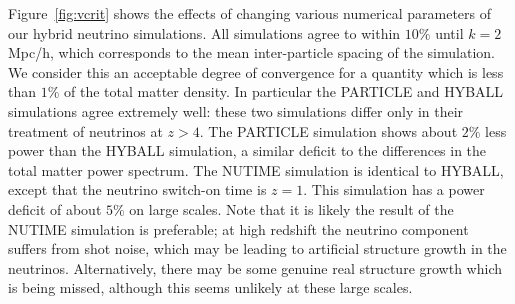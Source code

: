 \documentclass[useAMS, usenatbib]{mnras}
\newcommand{\spb}[1]{{\textsc{\textcolor{red}{[{\bf SPB}: #1]}}}}
\begin{document}
%
Figure~\ref{fig:vcrit} shows the effects of changing various numerical parameters of our hybrid neutrino simulations. All simulations agree to within $10\%$ until $k = 2$ Mpc/h, which corresponds to the mean inter-particle spacing of the simulation. We consider this an acceptable degree of convergence for a quantity which is less than $1\%$ of the total matter density. In particular the PARTICLE and HYBALL simulations agree extremely well: these two simulations differ only in their treatment of neutrinos at $z > 4$. The PARTICLE simulation shows about $2\%$ less power than the HYBALL simulation, a similar deficit to the differences in the total matter power spectrum. The NUTIME simulation is identical to HYBALL, except that the neutrino switch-on time is $z=1$. This simulation has a power deficit of about $5\%$ on large scales. Note that it is likely the result of the NUTIME simulation is preferable; at high redshift the neutrino component suffers from shot noise, which may be leading to artificial structure growth in the neutrinos. Alternatively, there may be some genuine real structure growth which is being missed, although this seems unlikely at these large scales.
\end{document}
